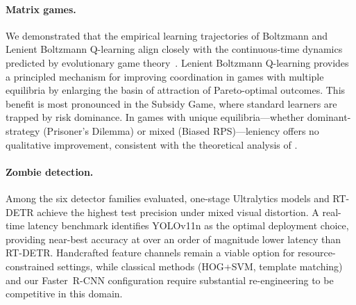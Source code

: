 \documentclass[11pt,a4paper]{article}
\begin{document}
\paragraph{Matrix games.}
We demonstrated that the empirical learning trajectories of Boltzmann and Lenient Boltzmann Q-learning align closely with the continuous-time dynamics predicted by evolutionary game theory~\citep{bloembergen2015}. Lenient Boltzmann Q-learning provides a principled mechanism for improving coordination in games with multiple equilibria by enlarging the basin of attraction of Pareto-optimal outcomes. This benefit is most pronounced in the Subsidy Game, where standard learners are trapped by risk dominance. In games with unique equilibria---whether dominant-strategy (Prisoner's Dilemma) or mixed (Biased RPS)---leniency offers no qualitative improvement, consistent with the theoretical analysis of \citet{panait2006}.

\paragraph{Zombie detection.}
Among the six detector families evaluated, one-stage Ultralytics models and RT-DETR achieve the highest test precision under mixed visual distortion. A real-time latency benchmark identifies YOLOv11n as the optimal deployment choice, providing near-best accuracy at over an order of magnitude lower latency than RT-DETR. Handcrafted feature channels remain a viable option for resource-constrained settings, while classical methods (HOG+SVM, template matching) and our Faster~R-CNN configuration require substantial re-engineering to be competitive in this domain.



\end{document}
